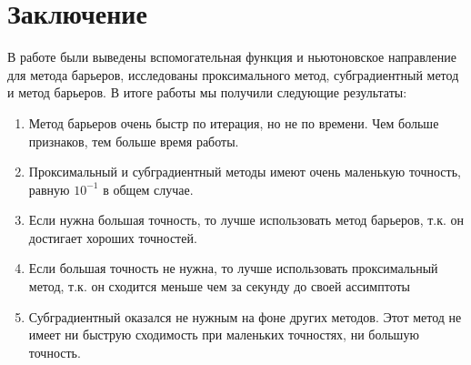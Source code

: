 \documentclass[12pt, a4paper]{article}
\begin{document}
    \section{Заключение}
    В работе были выведены вспомогательная функция и ньютоновское направление для метода барьеров, исследованы проксимального метод, субградиентный метод и метод барьеров.
    В итоге работы мы получили следующие результаты:
    \begin{enumerate}
        \item Метод барьеров очень быстр по итерация, но не по времени. Чем больше признаков, тем больше время работы.
        \item Проксимальный и субградиентный методы имеют очень маленькую точность, равную $10^{-1}$ в общем случае.
        \item Если нужна большая точность, то лучше использовать метод барьеров, т.к. он достигает хороших точностей.
        \item Если большая точность не нужна, то лучше использовать проксимальный метод, т.к. он сходится меньше чем за секунду до своей ассимптоты
        \item Субградиентный оказался не нужным на фоне других методов. Этот метод не имеет ни быструю сходимость при маленьких точностях, ни большую точность.
    \end{enumerate}
\end{document}
